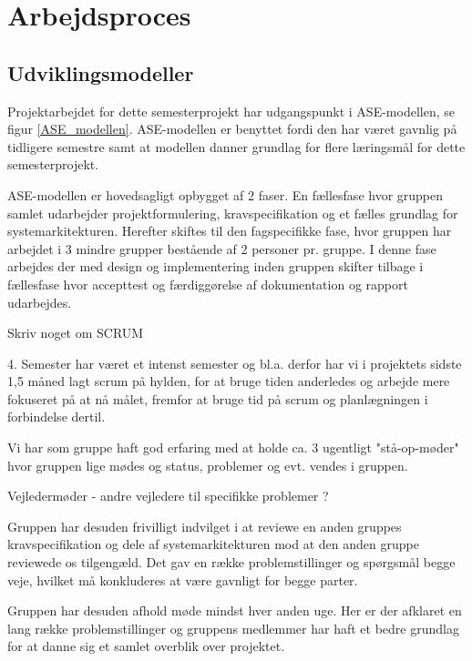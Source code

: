 
\chapter{Arbejdsproces}

\section{Udviklingsmodeller}

Projektarbejdet for dette semesterprojekt har udgangspunkt i ASE-modellen, se figur \ref{ASE_modellen}. ASE-modellen er benyttet fordi den har været gavnlig på tidligere semestre samt at modellen danner grundlag for flere læringsmål for dette semesterprojekt.

ASE-modellen er hovedsagligt opbygget af 2 faser. En fællesfase hvor gruppen samlet udarbejder projektformulering, kravspecifikation og et fælles grundlag for systemarkitekturen. Herefter skiftes til den fagspecifikke fase, hvor gruppen har arbejdet i 3 mindre grupper bestående af 2 personer pr. gruppe. I denne fase arbejdes der med design og implementering inden gruppen skifter tilbage i fællesfase hvor accepttest og færdiggørelse af dokumentation og rapport udarbejdes. 




Skriv noget om SCRUM



4. Semester har været et intenst semester og bl.a. derfor har vi i projektets sidste 1,5 måned lagt scrum på hylden, for at bruge tiden anderledes og arbejde mere fokuseret på at nå målet, fremfor at bruge tid på scrum og planlægningen i forbindelse dertil. 

Vi har som gruppe haft god erfaring med at holde ca. 3 ugentligt "stå-op-møder" hvor gruppen lige mødes og status, problemer og evt. vendes i gruppen. 

Vejledermøder - andre vejledere til specifikke problemer ?

Gruppen har desuden frivilligt indvilget i at reviewe en anden gruppes kravspecifikation og dele af systemarkitekturen mod at den anden gruppe reviewede os tilgengæld. Det gav en række problemstillinger og spørgsmål begge veje, hvilket må konkluderes at være gavnligt for begge parter.

Gruppen har desuden afhold møde mindst hver anden uge. Her er der afklaret en lang række problemstillinger og gruppens medlemmer har haft et bedre grundlag for at danne sig et samlet overblik over projektet. 


